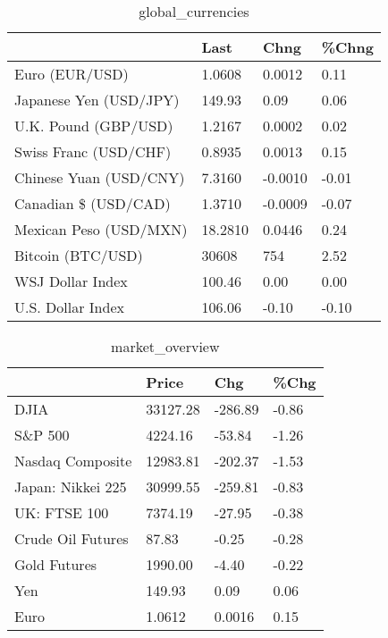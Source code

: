 \documentclass{article}%
\begin{document}
%


\begin{table}[htbp]%
\caption{global\_currencies}%
\centering%
\begin{adjustbox}{width=1\textwidth}%
\begin{tabular}{llll}
\toprule
                       &    Last &    Chng & \%Chng \\
\midrule
        Euro (EUR/USD) &  1.0608 &  0.0012 &  0.11 \\
Japanese Yen (USD/JPY) &  149.93 &    0.09 &  0.06 \\
  U.K. Pound (GBP/USD) &  1.2167 &  0.0002 &  0.02 \\
 Swiss Franc (USD/CHF) &  0.8935 &  0.0013 &  0.15 \\
Chinese Yuan (USD/CNY) &  7.3160 & -0.0010 & -0.01 \\
  Canadian \$ (USD/CAD) &  1.3710 & -0.0009 & -0.07 \\
Mexican Peso (USD/MXN) & 18.2810 &  0.0446 &  0.24 \\
     Bitcoin (BTC/USD) &   30608 &     754 &  2.52 \\
      WSJ Dollar Index &  100.46 &    0.00 &  0.00 \\
     U.S. Dollar Index &  106.06 &   -0.10 & -0.10 \\
\bottomrule
\end{tabular}
%
\end{adjustbox}%
\end{table}

%


\begin{table}[htbp]%
\caption{market\_overview}%
\centering%
\begin{adjustbox}{width=1\textwidth}%
\begin{tabular}{llll}
\toprule
                  &    Price &     Chg &  \%Chg \\
\midrule
             DJIA & 33127.28 & -286.89 & -0.86 \\
          S\&P 500 &  4224.16 &  -53.84 & -1.26 \\
 Nasdaq Composite & 12983.81 & -202.37 & -1.53 \\
Japan: Nikkei 225 & 30999.55 & -259.81 & -0.83 \\
     UK: FTSE 100 &  7374.19 &  -27.95 & -0.38 \\
Crude Oil Futures &    87.83 &   -0.25 & -0.28 \\
     Gold Futures &  1990.00 &   -4.40 & -0.22 \\
              Yen &   149.93 &    0.09 &  0.06 \\
             Euro &   1.0612 &  0.0016 &  0.15 \\
\bottomrule
\end{tabular}
%
\end{adjustbox}%
\end{table}

%
\end{document}
